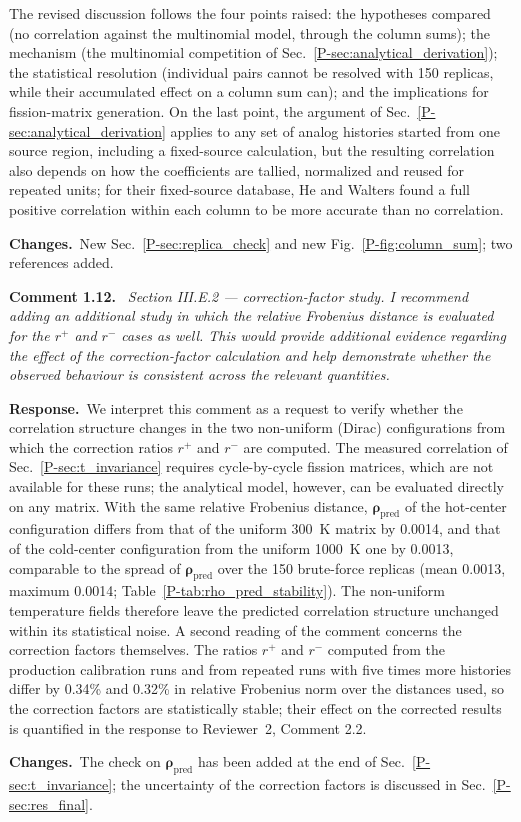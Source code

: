 \documentclass[11pt]{article}
\newenvironment{revcomment}[1]
  {\par\medskip\noindent\textbf{Comment #1.}\ \itshape}
  {\par}
\newcommand{\response}{\par\noindent\textbf{Response.}\ }
\newcommand{\changes}{\par\noindent\textbf{Changes.}\ }
\begin{document}
The revised discussion follows the four points raised: the hypotheses compared (no correlation against the multinomial model, through the column sums); the mechanism (the multinomial competition of Sec.~\ref{P-sec:analytical_derivation}); the statistical resolution (individual pairs cannot be resolved with 150 replicas, while their accumulated effect on a column sum can); and the implications for fission-matrix generation. On the last point, the argument of Sec.~\ref{P-sec:analytical_derivation} applies to any set of analog histories started from one source region, including a fixed-source calculation, but the resulting correlation also depends on how the coefficients are tallied, normalized and reused for repeated units; for their fixed-source database, He and Walters found a full positive correlation within each column to be more accurate than no correlation.
\changes New Sec.~\ref{P-sec:replica_check} and new Fig.~\ref{P-fig:column_sum}; two references added.

\begin{revcomment}{1.12}
Section III.E.2 --- correction-factor study. I recommend adding an additional study in
which the relative Frobenius distance is evaluated for the $r^+$ and $r^-$ cases as well.
This would provide additional evidence regarding the effect of the correction-factor
calculation and help demonstrate whether the observed behaviour is consistent across the
relevant quantities.
\end{revcomment}
\response We interpret this comment as a request to verify whether the correlation structure changes in the two non-uniform (Dirac) configurations from which the correction ratios $r^{+}$ and $r^{-}$ are computed. The measured correlation of Sec.~\ref{P-sec:t_invariance} requires cycle-by-cycle fission matrices, which are not available for these runs; the analytical model, however, can be evaluated directly on any matrix. With the same relative Frobenius distance, $\boldsymbol\rho_{\text{pred}}$ of the hot-center configuration differs from that of the uniform 300~K matrix by 0.0014, and that of the cold-center configuration from the uniform 1000~K one by 0.0013, comparable to the spread of $\boldsymbol\rho_{\text{pred}}$ over the 150 brute-force replicas (mean 0.0013, maximum 0.0014; Table~\ref{P-tab:rho_pred_stability}). The non-uniform temperature fields therefore leave the predicted correlation structure unchanged within its statistical noise.
A second reading of the comment concerns the correction factors themselves. The ratios $r^{+}$ and $r^{-}$ computed from the production calibration runs and from repeated runs with five times more histories differ by 0.34\% and 0.32\% in relative Frobenius norm over the distances used, so the correction factors are statistically stable; their effect on the corrected results is quantified in the response to Reviewer~2, Comment 2.2.
\changes The check on $\boldsymbol\rho_{\text{pred}}$ has been added at the end of Sec.~\ref{P-sec:t_invariance}; the uncertainty of the correction factors is discussed in Sec.~\ref{P-sec:res_final}.
\end{document}

